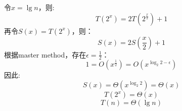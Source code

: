\begin{solution}
    令$x=\lg n$，则:
    $$T(2^{x}) = 2T(2^{\frac x 2}) + 1$$
    再令$S(x)=T(2^{x})$，则：
    $$S(x) = 2S(\frac x 2) + 1$$
    根据master method，存在$\epsilon=\frac 1 2$：
    $$1 = O(x^{\frac 1 2}) = O(x^{\log_2{2}-\epsilon})$$
    因此:
    $$S(x)=\Theta(x^{\log_2{2}}) = \Theta(x)$$
    $$T(2^{x})=\Theta(x)$$
    $$T(n)=\Theta(\lg n)$$
\end{solution}